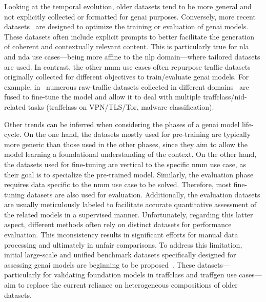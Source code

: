 Looking at the temporal evolution, older datasets tend to be more general and not explicitly collected or formatted for \gls{genai} purposes. 
Conversely, more recent datasets~\cite{zhu2023loghub,mani2023enhancing,karim2023spec5g,maatouk2023teleqna} are designed to optimize the training or evaluation of \gls{genai} models. 
%
These datasets often include explicit prompts to better facilitate the generation of coherent and contextually relevant content.
%
This is particularly true for \gls{nla} and \gls{nda} use cases---being more affine to the \gls{nlp} domain---where tailored datasets are used. 
In contrast, the other \gls{nmm} use cases often repurpose traffic datasets originally collected for different objectives to train/evaluate \gls{genai} models.
For example, in~\cite{lin2022} numerous raw-traffic datasets collected in different domains~\cite{lashkari2017characterization,sharafaldin2018toward,van2020flowprint,lin2022} 
are fused to fine-tune the  model and allow it to deal with multiple 
\gls{traffclass}/\gls{nid}-related tasks (\eg \gls{traffclass} on VPN/TLS/Tor, malware classification).

Other trends can be inferred when considering the phases of a \gls{genai} model life-cycle. 
On the one hand, the datasets mostly used for pre-training are typically more generic than those used in the other phases, since they aim to allow the model learning a foundational understanding of the context.
On the other hand, the datasets used for fine-tuning are vertical to the specific \gls{nmm} use case, as their goal is to specialize the pre-trained model.
Similarly, the evaluation phase requires data specific to the \gls{nmm} use case to be solved. 
Therefore, most fine-tuning datasets are also used for evaluation. 
%
Additionally, the evaluation datasets are usually meticulously labeled to facilitate accurate quantitative assessment of the related models in a supervised manner.
%
Unfortunately, regarding this latter aspect, different methods often rely on distinct datasets for performance evaluation. 
This inconsistency results in significant efforts for manual data processing and ultimately in unfair comparisons. 
To address this limitation, initial large-scale and unified benchmark datasets specifically designed for assessing \gls{genai} models are beginning to be proposed~\cite{qian2024netbench}. These datasets---particularly for validating foundation models in \gls{traffclass} and \gls{traffgen} use cases---aim to replace the current reliance on heterogeneous compositions of older datasets.

